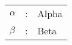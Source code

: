 \begin{tabular}{lrl}
{$\alpha$}              & : & Alpha  \\
{$\beta$}               & : & Beta \\
\end{tabular}
